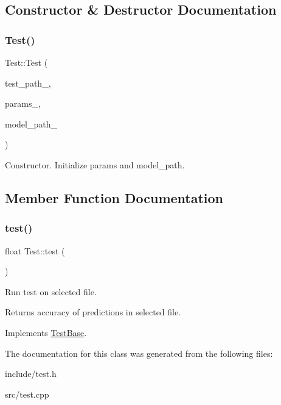 \subsection{Constructor \& Destructor Documentation}
\mbox{\label{classTest_a6eeaef1054e710158c2d48a6c3497a23}} 
\subsubsection{\texorpdfstring{Test()}{Test()}}
{\footnotesize\ttfamily Test\+::\+Test (\begin{DoxyParamCaption}\item[{string}]{test\+\_\+path\+\_\+,  }\item[{const \hyperlink{structTrainParameters}{Train\+Parameters} \&}]{params\+\_\+,  }\item[{string}]{model\+\_\+path\+\_\+ }\end{DoxyParamCaption})\hspace{0.3cm}{\ttfamily [explicit]}}

Constructor. Initialize params and model\+\_\+path. 

\subsection{Member Function Documentation}
\mbox{\label{classTest_ae984138ce2da7b201d3fa97a4b775fb3}} 
\subsubsection{\texorpdfstring{test()}{test()}}
{\footnotesize\ttfamily float Test\+::test (\begin{DoxyParamCaption}{ }\end{DoxyParamCaption})\hspace{0.3cm}{\ttfamily [virtual]}}

Run test on selected file. \begin{DoxyReturn}{Returns}
accuracy of predictions in selected file. 
\end{DoxyReturn}


Implements \hyperlink{classTestBase}{Test\+Base}.



The documentation for this class was generated from the following files\+:\begin{DoxyCompactItemize}
\item 
include/test.\+h\item 
src/test.\+cpp\end{DoxyCompactItemize}
